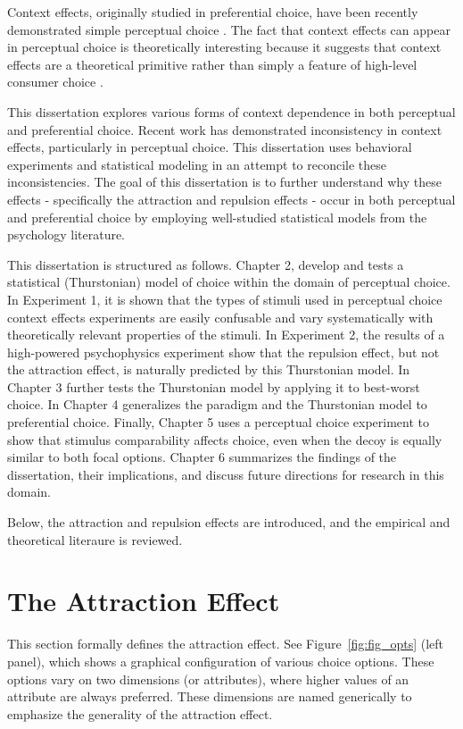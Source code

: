 Context effects, originally studied in preferential choice, have been recently demonstrated simple perceptual choice \parencite{trueblood2013not,spektorWhenGoodLooks2018b,liaoInfluenceDistanceDecoy2021,spektorRepulsionEffectPreferential2022,yearsleyContextEffectsSimilarity2022,truebloodPhantomDecoyEffect2017c, turnerCompetingTheoriesMultialternative2018a, evansImpactPresentationOrder2021}. The fact that context effects can appear in perceptual choice is theoretically interesting because it suggests that context effects are a theoretical primitive rather than simply a feature of high-level consumer choice \parencite{trueblood2013not}. 

This dissertation explores various forms of context dependence in both perceptual and preferential choice. Recent work has demonstrated inconsistency in context effects, particularly in perceptual choice. This dissertation uses behavioral experiments and statistical modeling in an attempt to reconcile these inconsistencies. The goal of this dissertation is to further understand why these effects - specifically the attraction and repulsion effects - occur in both perceptual and preferential choice by employing well-studied statistical models from the psychology literature.

This dissertation is structured as follows. Chapter 2, develop and tests a statistical (Thurstonian) model of choice within the domain of perceptual choice. In Experiment 1, it is shown that the types of stimuli used in perceptual choice context effects experiments are easily confusable and vary systematically with theoretically relevant properties of the stimuli. In Experiment 2, the results of a high-powered psychophysics experiment show that the repulsion effect, but not the attraction effect, is naturally predicted by this Thurstonian model. In Chapter 3 further tests the Thurstonian model by applying it to best-worst choice. In Chapter 4 generalizes the paradigm and the Thurstonian model to preferential choice. Finally, Chapter 5 uses a perceptual choice experiment to show that stimulus comparability affects choice, even when the decoy is equally similar to both focal options. Chapter 6 summarizes the findings of the dissertation, their implications, and discuss future directions for research in this domain. 

Below, the attraction and repulsion effects are introduced, and the empirical and theoretical literaure is reviewed.

\section{The Attraction Effect}
This section formally defines the attraction effect. See Figure~\ref{fig:fig_opts} (left panel), which shows a graphical configuration of various choice options. These options vary on two dimensions (or attributes), where higher values of an attribute are always preferred. These dimensions are named generically to emphasize the generality of the attraction effect.

